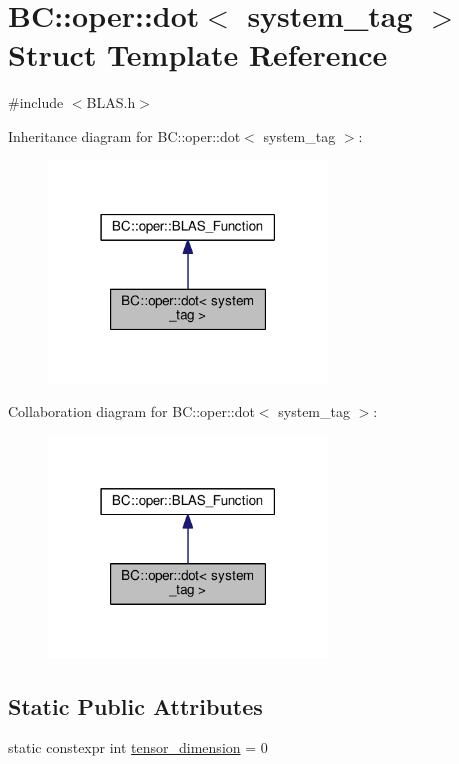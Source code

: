 \hypertarget{structBC_1_1oper_1_1dot}{}\section{BC\+:\+:oper\+:\+:dot$<$ system\+\_\+tag $>$ Struct Template Reference}
\label{structBC_1_1oper_1_1dot}


{\ttfamily \#include $<$B\+L\+A\+S.\+h$>$}



Inheritance diagram for BC\+:\+:oper\+:\+:dot$<$ system\+\_\+tag $>$\+:
\nopagebreak
\begin{figure}[H]
\begin{center}
\leavevmode
\includegraphics[width=210pt]{structBC_1_1oper_1_1dot__inherit__graph}
\end{center}
\end{figure}


Collaboration diagram for BC\+:\+:oper\+:\+:dot$<$ system\+\_\+tag $>$\+:
\nopagebreak
\begin{figure}[H]
\begin{center}
\leavevmode
\includegraphics[width=210pt]{structBC_1_1oper_1_1dot__coll__graph}
\end{center}
\end{figure}
\subsection*{Static Public Attributes}
\begin{DoxyCompactItemize}
\item 
static constexpr int \hyperlink{structBC_1_1oper_1_1dot_a49c9907dcd4361b52672765f1369762f}{tensor\+\_\+dimension} = 0
\end{DoxyCompactItemize}


